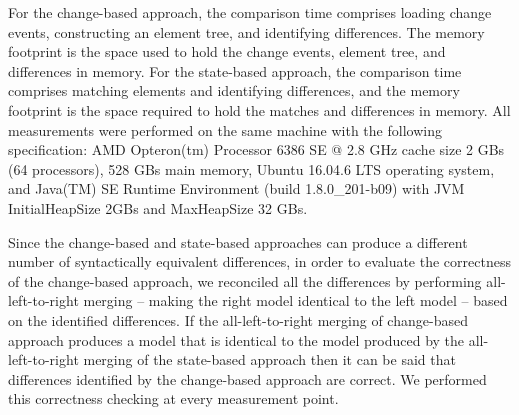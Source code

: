 \documentclass{jot}
\newcommand{\dk}[1]{\textcolor{blue}{\textbf{[Dimitris: #1]}}}
\begin{document}
    For the change-based approach, the comparison time comprises loading change events, constructing an element tree, and identifying differences. The memory footprint is the space used to hold the change events, element tree, and differences in memory. For the state-based approach, the comparison time comprises matching elements and identifying differences, and the memory footprint is the space required to hold the matches and differences in memory. All measurements were performed on the same machine with the following specification: AMD Opteron(tm) Processor 6386 SE @ 2.8 GHz cache size 2 GBs (64 processors), 528 GBs main memory, Ubuntu 16.04.6 LTS operating system, and Java(TM) SE Runtime Environment (build 1.8.0\_201-b09) with JVM \textsf{InitialHeapSize} 2GBs and \textsf{MaxHeapSize} 32 GBs.
    
    Since the change-based and state-based approaches can produce a different number of syntactically equivalent differences, in order to evaluate the correctness of the change-based approach, we reconciled all the differences by performing all-left-to-right merging -- making the right model identical to the left model -- based on the identified differences. If the all-left-to-right merging of change-based approach produces a model that is identical to the model produced by the all-left-to-right merging of the state-based approach then it can be said that differences identified by the change-based approach are correct. We performed this correctness checking at every measurement point.
    
\end{document}
